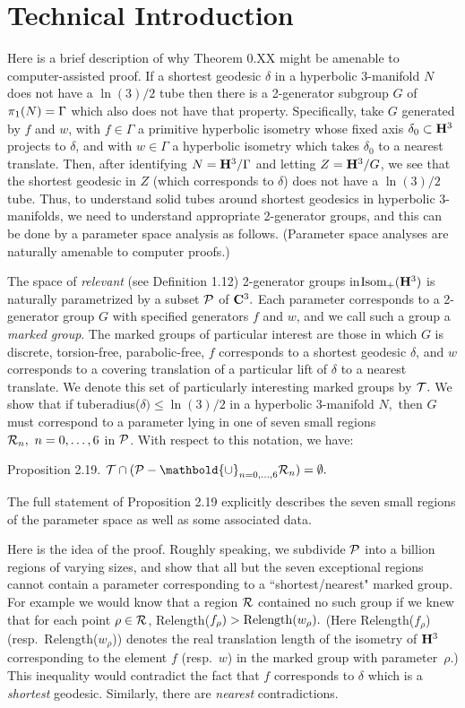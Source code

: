 \section{Technical Introduction}
Here is a brief description of why Theorem 0.XX might be amenable to 
computer-assisted proof.
If a shortest geodesic $\delta$ in a hyperbolic $3$-manifold $N$ does not have 
a $\ln(3)/2$
tube then there is a 2-generator subgroup $G$ of $\pi_1(N)\break =\Gamma$
which also does not have that property.
Specifically, take $G$ generated by $f$ and $w$,
with $f\in \Gamma$ a primitive hyperbolic isometry
whose fixed axis $\delta_0 \subset {\bf H}^3$ projects to $\delta$, and 
with $w\in \Gamma$ a hyperbolic isometry
which takes $\delta_0$ to a nearest translate.
Then, after identifying $N={\bf H}^3/\Gamma$ and letting 
$Z={\bf H}^3/G$,
we see that the shortest geodesic in $Z$ (which corresponds to $\delta$)
does not have 
a $\ln(3)/2$ tube. 
Thus, to understand solid tubes around shortest geodesics in hyperbolic 
$3$-manifolds, we need to understand appropriate 2-generator groups, and this 
can be done by a parameter space analysis as follows.  (Parameter space 
analyses are naturally amenable to 
computer proofs.)

The space of {\it relevant} (see Definition 1.12) 2-generator groups 
in\break ${\rm Isom}_+({\bf H}^3)$ is naturally
parametrized by a subset ${\cal P}$ of ${\bf C}^3.$  
Each parameter corresponds to a
2-generator group $G$ with specified generators $f$ and $w$, and we call 
such a group a {\it marked group}. 
The marked groups of particular interest are those in which $G$ is
discrete, torsion-free, parabolic-free, $f$ corresponds to a shortest
geodesic $\delta$, and $w$ corresponds to a
covering translation of a particular lift of
$\delta$ to a nearest translate.  
We denote this set of particularly interesting marked groups by ${\cal T}.$
We show that if tuberadius($\delta) \le \ln(3)/2$ 
in a hyperbolic $3$-manifold $N,$ then 
$G$ must correspond to a parameter lying in one of seven small regions
${\cal R}_n,\ n=0,\ldots,6$ 
in ${\cal P}$.  
With respect to this notation, we have:

 {\elevensc Proposition 2.19}.
${\cal T} \cap ({\cal P} - \mathbold{\cup}_{n=0,\ldots,6}{\cal R}_n) = \emptyset.$
\vfill

The full statement of Proposition 2.19 explicitly describes the seven small
regions of the parameter space as well as some associated data.

Here is the idea of the proof.
Roughly speaking, we subdivide ${\cal P}$ into a billion regions
of varying sizes,
and show that all but the seven exceptional regions cannot contain 
a parameter corresponding to a  
``shortest/nearest" marked group.
For example we would know that 
a region ${\cal R}$ contained no such group if we knew that for each 
point $\rho\in {\cal R}$,
Relength($f_\rho) > {\rm Relength}(w_\rho).$  
(Here Relength($f_\rho$) (resp.\ Relength($w_\rho^{\phantom{|}}$))
denotes the real translation length of the isometry of ${\bf H}^3$ 
corresponding to
the element $f$ (resp.\ $w$) in the marked group with parameter~$\rho.$)
This inequality would contradict the fact that $f$ corresponds to $\delta$ 
which is a {\it shortest} geodesic.  Similarly, there are {\it nearest}
contradictions.
